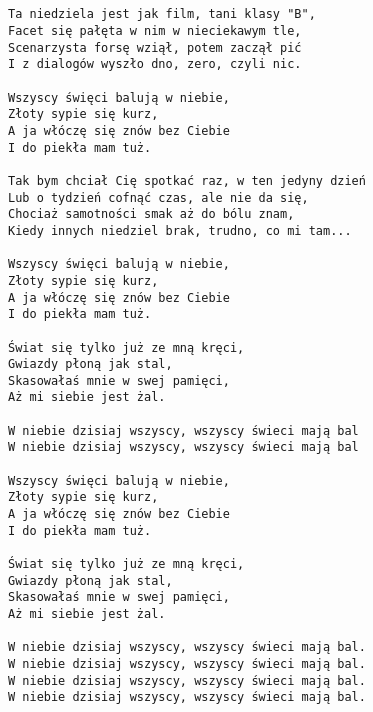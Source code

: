\documentclass[12pt]{article}
\begin{document}
\subsection*{}
\begin{verbatim}
Ta niedziela jest jak film, tani klasy "B",
Facet się pałęta w nim w nieciekawym tle,
Scenarzysta forsę wziął, potem zaczął pić
I z dialogów wyszło dno, zero, czyli nic.

Wszyscy święci balują w niebie,
Złoty sypie się kurz,
A ja włóczę się znów bez Ciebie
I do piekła mam tuż.

Tak bym chciał Cię spotkać raz, w ten jedyny dzień
Lub o tydzień cofnąć czas, ale nie da się,
Chociaż samotności smak aż do bólu znam,
Kiedy innych niedziel brak, trudno, co mi tam...

Wszyscy święci balują w niebie,
Złoty sypie się kurz,
A ja włóczę się znów bez Ciebie
I do piekła mam tuż.

Świat się tylko już ze mną kręci,
Gwiazdy płoną jak stal,
Skasowałaś mnie w swej pamięci,
Aż mi siebie jest żal.

W niebie dzisiaj wszyscy, wszyscy świeci mają bal
W niebie dzisiaj wszyscy, wszyscy świeci mają bal

Wszyscy święci balują w niebie,
Złoty sypie się kurz,
A ja włóczę się znów bez Ciebie
I do piekła mam tuż.

Świat się tylko już ze mną kręci,
Gwiazdy płoną jak stal,
Skasowałaś mnie w swej pamięci,
Aż mi siebie jest żal.

W niebie dzisiaj wszyscy, wszyscy świeci mają bal.
W niebie dzisiaj wszyscy, wszyscy świeci mają bal.
W niebie dzisiaj wszyscy, wszyscy świeci mają bal.
W niebie dzisiaj wszyscy, wszyscy świeci mają bal.
\end{verbatim}
\clearpage
\end{document}
